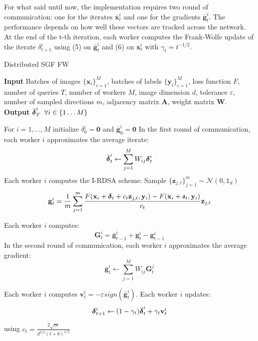 For what said until now, the implementation requires two round of communication: one for the iterates $\bar{\mathbf{x}}_t^i$ and one for the gradients $\bar{\mathbf{g}}_t^i$. The performance depends on how well these vectors are tracked across the network.\\
At the end of the t-th iteration, each worker computes the Frank-Wolfe update of the iterate \mbox{\boldmath$ \delta$}$_{t+1}^i$ using (5) on $\bar{\mathbf{g}}_t^i$ and (6) on $\bar{\mathbf{x}}_t^i$ with $\gamma_t = t^{-1/2}$.\\
\begin{algorithm}
	\caption{Distributed SGF FW}\label{distributed}
	\textbf{Input} Batches of images $\{\mathbf{x}_i\}_{i=1}^M$, batches of labels $\{\mathbf{y}_i\}_{i=1}^M$, loss function $F$, number of queries $T$, number of workers $M$, image dimension $d$, tolerance $\varepsilon$, number of sampled directions $m$, adjacency matrix $\mathbf{A}$, weight matrix $\mathbf{W}$.\\
	\textbf{Output} $\bar{\mbox{\boldmath$ \delta$}}_T^i\;\;\forall i \in \{1\dots M\}$
	\begin{algorithmic}[1]		
		\State For $i=1,\dots, M$ initialize \mbox{\boldmath$ \delta$}$_0^i =\mathbf{0} $ and $\bar{\mathbf{g}}_0^i = \mathbf{0}$
		\State In the first round of communication, each worker $i$ approximates the average iterate: \newline
		\[\bar{\mbox{\boldmath$ \delta$}}_t^i \leftarrow \sum_{j=1}^{M} W_{ij}\mbox{\boldmath$ \delta$}_t^i\]
		\State Each worker $i$ computes the I-RDSA scheme:\newline 
		Sample $\{\mathbf{z}_{j,t}\}_{j=1}^m \sim\mathcal{N}(0,\mathbb{1}_d)$ \newline
		\[\mathbf{g}_t^i = \frac{1}{m} \sum_{j=1}^{m} \frac{F(\mathbf{x}_i + \mbox{\boldmath$ \delta$}_t + c_t\mathbf{z}_{j,t}, \mathbf{y}_i) - F(\mathbf{x}_i + \mbox{\scriptsize\boldmath$ \delta$}_t, \mathbf{y}_i)}{c_t}\mathbf{z}_{j,t}\]
		
		\State  Each worker $i$ computes:
		\[ \mathbf{G}_t^i = \bar{\mathbf{g}}_{t-1}^i + \mathbf{g}_t^i - \mathbf{g}_{t-1}^i \]
		\State In the second round of communication, each worker $i$ approximates the average gradient:
		\[ \bar{\mathbf{g}}_t^i \leftarrow \sum_{j=1}^{M} W_{ij}\mathbf{G}_t^j  \]
		
		\State Each worker $i$ computes $\mathbf{v}_t^i = - \varepsilon sign(\bar{\mathbf{g}}^i_t)$.
		\State Each worker $i$ updates:
		\[\mbox{\boldmath$ \delta$}_{t+1}^i \leftarrow (1-\gamma_t)\bar{\mbox{\boldmath$ \delta$}}_t^i + \gamma_t\mathbf{v}_t^i\]
		\EndFor
		
	\end{algorithmic}
\end{algorithm}
 using $c_t = \frac{2\sqrt{m}}{d^{3/2}(t+8)^{1/3}}$